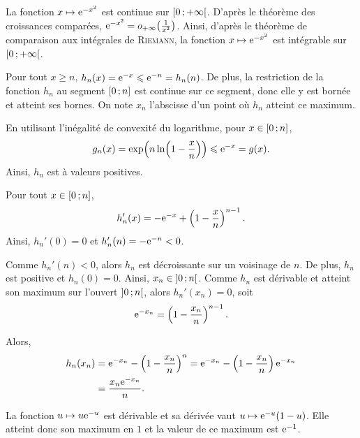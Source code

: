 \begin{solution}
\begin{reponses}
\item La fonction $x \mapsto \mathrm{e}^{-x^2}$ est continue sur $\left[0\,;+\infty\right[$. D'après le théorème des croissances comparées, $\mathrm{e}^{-x^2} = o_{+\infty}\mathopen{}\left(\frac{1}{x^2}\right)$. Ainsi, d'après le théorème de comparaison aux intégrales de \textsc{Riemann}, la fonction $x \mapsto \mathrm{e}^{-x^2}$ est intégrable sur $\left[0\,;+\infty\right[$.

\item
\begin{reponses}
\item Pour tout $x \geqslant n$, $h_n(x) = \mathrm{e}^{-x} \leqslant \mathrm{e}^{-n} = h_n(n)$. De plus, la restriction de la fonction $h_n$ au segment $\left[0\,;n\right]$ est continue sur ce segment, donc elle y est bornée et atteint ses bornes. On note $x_n$ l'abscisse d'un point où $h_n$ atteint ce maximum.

\item {}En utilisant l'inégalité de convexité du logarithme, pour $x \in \left[0\,;n\right]$,
\[
g_n(x)
= \exp\mathopen{}\left(n \ln\mathopen{}\left(1 - \frac{x}{n}\right)\right)
\leqslant \mathrm{e}^{-x} = g(x).
\]
Ainsi, $h_n$ est à valeurs positives.

\item Pour tout $x \in \left[0\,;n\right]$,
\[
h_n'(x) = -\mathrm{e}^{-x} + \left(1 - \frac{x}{n}\right)^{n-1}.
\]
Ainsi, $h_n'(0) = 0$ et $h_n'(n) = - \mathrm{e}^{-n} < 0$.

Comme $h_n'(n) < 0$, alors $h_n$ est décroissante sur un voisinage de $n$. De plus, $h_n$ est positive et $h_n(0) = 0$. Ainsi, $x_n \in \left]0\,;n\right[$. Comme $h_n$ est dérivable et atteint son maximum sur l'ouvert $\left]0\,;n\right[$, alors $h_n'(x_n) = 0$, soit
\[
\mathrm{e}^{-x_n} = \left(1 - \frac{x_n}{n}\right)^{n-1}.
\]

Alors,
\begin{align*}
h_n(x_n)
&= \mathrm{e}^{-x_n} - \left(1 - \frac{x_n}{n}\right)^n
= \mathrm{e}^{-x_n} - \left(1 - \frac{x_n}{n}\right) \mathrm{e}^{-x_n}\\
&= \frac{x_n \mathrm{e}^{-x_n}}{n}.
\end{align*}

\item La fonction $u \mapsto u \mathrm{e}^{-u}$ est dérivable et sa dérivée vaut $u \mapsto \mathrm{e}^{-u} (1 - u)$. Elle atteint donc son maximum en $1$ et la valeur de ce maximum est $\mathrm{e}^{-1}$.


\end{reponses}
\end{reponses}
\end{solution}
